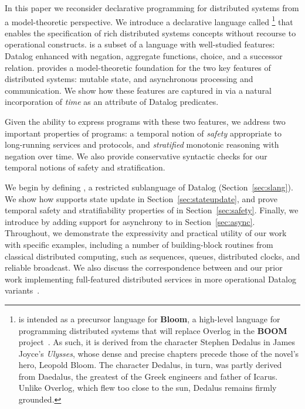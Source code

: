 In this paper we reconsider declarative programming for distributed
systems from a model-theoretic perspective. We introduce a declarative
language called \lang\footnote{\small \lang is intended as a precursor
  language for \textbf{Bloom}, a high-level language for programming
  distributed systems that will replace Overlog in the \textbf{BOOM}
  project~\cite{boom-eurosys}.  As such, it is derived from the
  character Stephen Dedalus in James Joyce's \emph{Ulysses}, whose
  dense and precise chapters precede those of the novel's hero,
  Leopold Bloom.  The character Dedalus, in turn, was partly derived
  from Daedalus, the greatest of the Greek engineers and father of
  Icarus.  Unlike Overlog, which flew too close to the sun, Dedalus
  remains firmly grounded.  } that enables the specification of rich
distributed systems concepts without recourse to operational
constructs.  \lang is a subset of a language with well-studied
features: Datalog enhanced with negation, aggregate functions, choice,
and a successor relation.  \lang provides a model-theoretic foundation
for the two key features of distributed systems: mutable state, and
asynchronous processing and communication.  We show how these features
are captured in \lang via a natural incorporation of {\em time} as an
attribute of Datalog predicates.

Given the ability to express programs with these two features, we
address two important properties of \lang programs: a temporal
notion of {\em safety} appropriate to long-running services and
protocols, and {\em stratified} monotonic reasoning with negation over
time.  We
also provide conservative syntactic checks for our temporal notions of
safety and stratification.

We begin by defining \slang, a restricted sublanguage of Datalog
(Section~\ref{sec:slang}). We show how \slang supports state update in
Section~\ref{sec:stateupdate}, and prove temporal safety and
stratifiability properties of \slang in Section~\ref{sec:safety}.
Finally, we introduce \lang by adding
support for asynchrony to \slang in
Section~\ref{sec:async}. Throughout, we demonstrate the expressivity
and practical utility of our work with specific examples, including a
number of building-block routines from classical distributed
computing, such as sequences, queues, distributed clocks, and reliable
broadcast.  We also discuss the correspondence between \lang and our
prior work implementing full-featured distributed services in 
more operational Datalog variants~\cite{boom-eurosys,Loo2009-CACM}.

